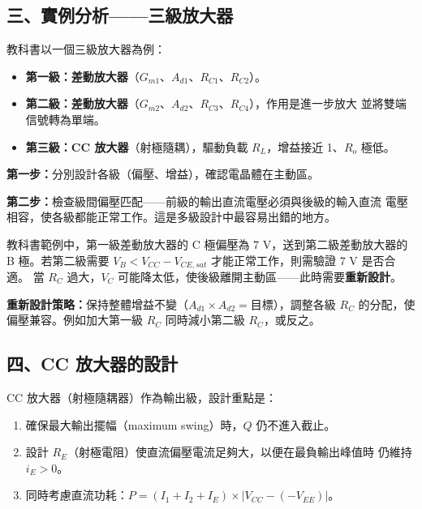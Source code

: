 \documentclass[12pt]{article}
\begin{document}
\subsection*{三、實例分析——三級放大器}


教科書以一個三級放大器為例：
\begin{itemize}[leftmargin=2em,itemsep=2pt]
  \item \textbf{第一級：差動放大器}（$G_{m1}$、$A_{d1}$、$R_{C1}$、$R_{C2}$）。
  \item \textbf{第二級：差動放大器}（$G_{m2}$、$A_{d2}$、$R_{C3}$、$R_{C4}$），作用是進一步放大
        並將雙端信號轉為單端。
  \item \textbf{第三級：CC 放大器}（射極隨耦），驅動負載 $R_L$，增益接近 1、$R_o$ 極低。
\end{itemize}

\begin{keybox}[設計流程精要]
\textbf{第一步：}分別設計各級（偏壓、增益），確認電晶體在主動區。

\textbf{第二步：}檢查級間偏壓匹配——前級的輸出直流電壓必須與後級的輸入直流
電壓相容，使各級都能正常工作。這是多級設計中最容易出錯的地方。

\medskip
教科書範例中，第一級差動放大器的 C 極偏壓為 7 V，送到第二級差動放大器的
B 極。若第二級需要 $V_B < V_{CC} - V_{CE,sat}$ 才能正常工作，則需驗證 7 V 是否合適。
當 $R_C$ 過大，$V_C$ 可能降太低，使後級離開主動區——此時需要\textbf{重新設計}。

\medskip
\textbf{重新設計策略：}保持整體增益不變（$A_{d1} \times A_{d2} = \text{目標}$），調整各級 $R_C$
的分配，使偏壓兼容。例如加大第一級 $R_{C}$ 同時減小第二級 $R_C$，或反之。
\end{keybox}

\subsection*{四、CC 放大器的設計}

CC 放大器（射極隨耦器）作為輸出級，設計重點是：
\begin{enumerate}[leftmargin=2em]
  \item 確保最大輸出擺幅（maximum swing）時，$Q$ 仍不進入截止。
  \item 設計 $R_E$（射極電阻）使直流偏壓電流足夠大，以便在最負輸出峰值時
        仍維持 $i_E > 0$。
  \item 同時考慮直流功耗：$P = (I_1 + I_2 + I_{E}) \times |V_{CC} - (-V_{EE})|$。
\end{enumerate}
\end{document}
